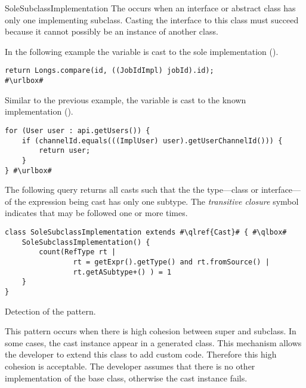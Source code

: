 \begin{pattern}{SoleSubclassImplementation}
The \thisp{} occurs when an interface or abstract class has only one implementing subclass.
Casting the interface to this class must succeed because it cannot possibly be an instance of another class.

\instances{}
In the following example the 
variable is cast to the sole implementation ().

\def\urlvar{http://bit.ly/ow2_proactive_scheduling_2Ulcjfs}
\begin{verbatim}
return Longs.compare(id, ((JobIdImpl) jobId).id);
#\urlbox#
\end{verbatim}

Similar to the previous example,
the variable  is cast to the known implementation ().

\def\urlvar{http://bit.ly/Javacord_Javacord_2GwGjuV}
\begin{verbatim}
for (User user : api.getUsers()) {
    if (channelId.equals(((ImplUser) user).getUserChannelId())) {
        return user;
    }
} #\urlbox#
\end{verbatim}


\detection{}
The following query returns all casts such that the the type---class or interface---of the expression being cast has only one subtype.
The \emph{transitive closure} symbol \code{+} indicates that  may be followed one or more times.

\begin{listing}
\begin{verbatim}
class SoleSubclassImplementation extends #\qlref{Cast}# { #\qlbox#
	SoleSubclassImplementation() {
		count(RefType rt | 
				rt = getExpr().getType() and rt.fromSource() | 
				rt.getASubtype+() ) = 1
	}
}
\end{verbatim}
\caption{Detection of the \thisp{} pattern.}
\label{lst:ql:SoleSubclassImplementationCast}
\end{listing}


\issues{}
This pattern occurs when there is high cohesion between super and subclass.
In some cases, the cast instance appear in a generated class.
This mechanism allows the developer to extend this class to add custom code.
Therefore this high cohesion is acceptable.
The developer assumes that there is no other implementation of the base class,
otherwise the cast instance fails.

\end{pattern}
